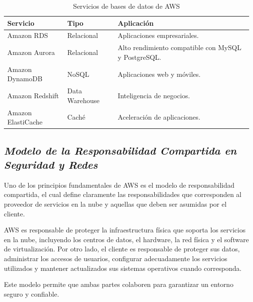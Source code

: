 \documentclass[12pt,a4paper]{article}
\begin{document}
\begin{table}[H]
\centering
\caption{Servicios de bases de datos de AWS}
\begin{tabularx}{\textwidth}{lXX}
\toprule
\textbf{Servicio} & \textbf{Tipo} & \textbf{Aplicación}\\
\midrule
Amazon RDS & Relacional & Aplicaciones empresariales.\\

Amazon Aurora & Relacional & Alto rendimiento compatible con MySQL y PostgreSQL.\\

Amazon DynamoDB & NoSQL & Aplicaciones web y móviles.\\

Amazon Redshift & Data Warehouse & Inteligencia de negocios.\\

Amazon ElastiCache & Caché & Aceleración de aplicaciones.\\
\bottomrule
\end{tabularx}
\end{table}

\subsection{{\color{azulnoche}\textbf{\textit{Modelo de la Responsabilidad Compartida en Seguridad y Redes}}}}

Uno de los principios fundamentales de AWS es el modelo de responsabilidad compartida, el cual define claramente las responsabilidades que corresponden al proveedor de servicios en la nube y aquellas que deben ser asumidas por el cliente.

AWS es responsable de proteger la infraestructura física que soporta los servicios en la nube, incluyendo los centros de datos, el hardware, la red física y el software de virtualización. Por otro lado, el cliente es responsable de proteger sus datos, administrar los accesos de usuarios, configurar adecuadamente los servicios utilizados y mantener actualizados sus sistemas operativos cuando corresponda.

Este modelo permite que ambas partes colaboren para garantizar un entorno seguro y confiable.
\end{document}
